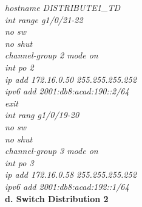 \documentclass[a4paper, 12pt]{article}
\begin{document}
\hspace*{2cm}\textit{hostname DISTRIBUTE1\_TD\\
\hspace*{2cm}int range g1/0/21-22\\
\hspace*{2cm}no sw\\
\hspace*{2cm}no shut\\
\hspace*{2cm}channel-group 2 mode on\\
\hspace*{2cm}int po 2\\
\hspace*{2cm}ip add 172.16.0.50 255.255.255.252\\
\hspace*{2cm}ipv6 add 2001:db8:acad:190::2/64\\
\hspace*{2cm}exit\\
\hspace*{2cm}int rang g1/0/19-20\\
\hspace*{2cm}no sw\\
\hspace*{2cm}no shut\\
\hspace*{2cm}channel-group 3 mode on\\
\hspace*{2cm}int po 3\\
\hspace*{2cm}ip add 172.16.0.58 255.255.255.252\\
\hspace*{2cm}ipv6 add 2001:db8:acad:192::1/64\\}
\hspace*{1cm}\textbf{d. Switch Distribution 2}\\
\end{document}
